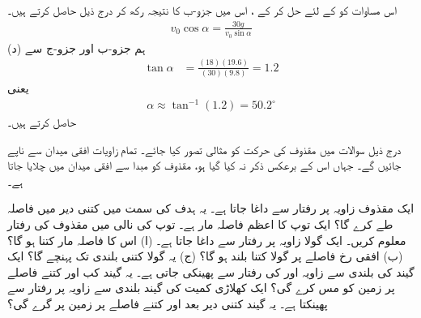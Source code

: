 اس مساوات کو  کے لئے  حل کر کے ، اس میں جزو-ب کا نتیجہ رکھ کر  درج ذیل حاصل کرتے ہیں۔
\begin{align*}
v_0\cos\alpha=\frac{30g}{v_0\sin\alpha}
\end{align*}
(د) ہم جزو-ب اور جزو-ج سے
\begin{align*}
\tan\alpha&=\frac{(18)(19.6)}{(30)(9.8)}=1.2
\end{align*}
یعنی
\begin{align*}
\alpha\approx \tan^{-1}(1.2)=50.2^{\circ}
\end{align*}
حاصل کرتے ہیں۔

درج ذیل سوالات میں مقذوف کی حرکت کو مثالی تصور کیا جائے۔ تمام زاویات افقی میدان سے ناپے جائیں گے۔ جہاں  اس کے برعکس ذکر نہ کیا گیا ہو، مقذوف کو مبدا سے افقی  میدان میں چلایا جاتا ہے۔

ایک مقذوف  زاویہ پر  رفتار سے داغا  جاتا ہے۔ یہ ہدف کی سمت میں  کتنی دیر میں  فاصلہ طے کرے گا؟
ایک توپ  کا اعظم  فاصلہ مار  ہے۔ توپ  کی نالی میں  مقذوف کی   رفتار معلوم کریں۔
ایک گولا   زاویہ پر  رفتار سے داغا  جاتا ہے۔ (ا)  اس کا فاصلہ مار کتنا ہو گا؟ (ب) افقی رخ  فاصلے پر  گولا  کتنا بلند ہو گا؟ (ج)  یہ گولا  کتنی بلندی تک پہنچے گا؟
ایک گیند  کی بلندی سے  زاویہ اور کی  رفتار سے پھینکی جاتی ہے۔ یہ گیند کب اور کتنے  فاصلے  پر زمین کو مس کرے گی؟ 
ایک کھلاڑی   کمیت  کی گیند   بلندی سے  زاویہ پر  رفتار سے پھینکتا ہے۔ یہ گیند کتنی دیر بعد اور کتنے فاصلے  پر زمین پر گرے گی؟

